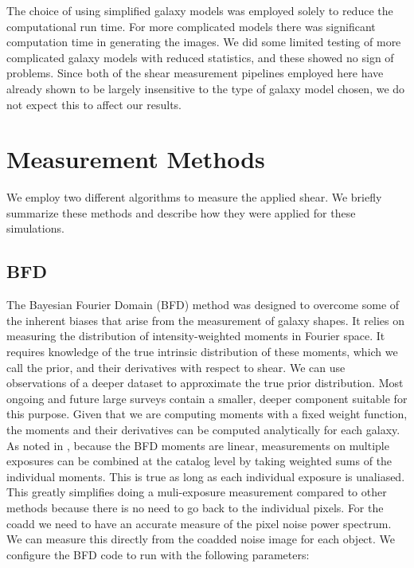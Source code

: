 \documentclass[fleqn,useAMS,usenatbib]{mnras}
\begin{document}
The choice of using simplified galaxy models was employed solely to reduce the 
computational run time.  For more complicated models there was significant 
computation time in generating the images.  We did some limited testing of more 
complicated galaxy models with reduced statistics, and these showed no sign of 
problems.  Since both of the shear measurement pipelines employed here have 
already shown to be largely insensitive to the type of galaxy model chosen, we 
do not expect this to affect our results.

\section{Measurement Methods}
\label{Section:Measurement}
We employ two different algorithms to measure the applied shear.  We briefly 
summarize these methods and describe how they were applied for these 
simulations.

\subsection{BFD}
\label{Section:BFD}
The Bayesian Fourier Domain (BFD) method \citep{Bernstein2014,Bernstein2016} 
was designed to overcome some of the inherent biases that arise from the 
measurement of galaxy shapes.  It relies on measuring the distribution of 
intensity-weighted moments in Fourier space.  It requires knowledge of the true 
intrinsic distribution of these moments, which we call the prior, and their 
derivatives with respect to shear.  We can use observations of a deeper dataset 
to approximate the true prior distribution.  Most ongoing and future large 
surveys contain a smaller, deeper component suitable for this purpose.  Given 
that we are computing moments with a fixed weight function, the moments and 
their derivatives can be computed analytically for each galaxy.  
As noted in \citep{Bernstein2016}, because the BFD moments are linear, 
measurements on multiple exposures can be combined at the catalog level by 
taking weighted sums of the individual moments.  This is true as long as each 
individual exposure is unaliased.  This greatly simplifies doing a 
muli-exposure measurement compared to other methods because there is no need to 
go back to the individual pixels.  
For the coadd we need to have an accurate measure of the pixel noise power 
spectrum.  We can measure this directly from the coadded noise image for each 
object.
We configure the BFD code to run with the following parameters:
\end{document}
